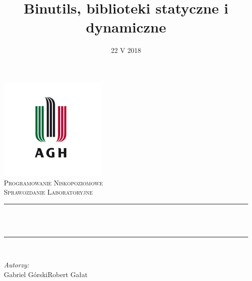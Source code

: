 \documentclass[12pt]{article}
\title{Binutils, biblioteki statyczne i dynamiczne} %
\author{} %
\date{22 V 2018}
\begin{document}

\begin{titlepage}
  \centering \vspace*{0.5 cm} \includegraphics[scale = 0.75]{agh.jpg}\\[1.0
  cm] %
  \textsc{\Large Programowanie Niskopoziomowe}\\[0.5 cm] %
  \textsc{\large Sprawozdanie Laboratoryjne}\\[0.5 cm] %
  \rule{\linewidth}{0.2 mm} \\[0.4 cm]
  { \huge \bfseries \thetitle}\\
  \rule{\linewidth}{0.2 mm} \\[1.5 cm]

  \begin{minipage}{0.4\textwidth}
    \begin{flushleft} \large \vspace{3cm}
      \emph{Autorzy:}\\
      Gabriel Górski\newline Robert Gałat %
    \end{flushleft}
  \end{minipage}~
  \begin{minipage}{0.4\textwidth}
    \begin{flushright} \large
    \end{flushright}
  \end{minipage}\\[2 cm]

  {\large \thedate}\\[2 cm]

  \vfill

\end{titlepage}
\end{document}
